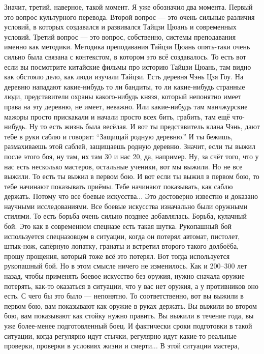 Значит, третий, наверное, 
такой момент. Я уже обозначил два момента. Первый 
это вопрос культурного перевода.
Второй вопрос --- это 
очень сильные различия условий, в которых создавался и 
развивался Тайцзи Цюань и современных условий.  Третий 
вопрос --- это вопрос, собственно, системы 
преподавания именно как методики. Методика 
преподавания Тайцзи Цюань опять-таки очень сильно была 
связана с контекстом, в котором это всё создавалось. 
То есть вот если вы посмотрите китайские фильмы про 
историю Тайцзи Цюань, там видно как обстояло 
дело, как люди изучали Тайцзи. Есть деревня Чэнь Цзя Гоу. 
На деревню нападают какие-нибудь то ли бандиты, то ли 
какие-нибудь странные люди, представители охраны
какого-нибудь князя, который непонятно имеет права на 
эту деревню, не имеет, неважно. Или какие-нибудь там 
манчжурские мажоры просто прискакали и начали просто 
всех бить, грабить, там ещё что-нибудь. Ну то есть 
жизнь была весёлая. И вот ты представитель клана Чэнь,  
дают тебе в руки саблю и говорят: ``Защищай родную деревню.''
И 
ты бежишь, размахиваешь этой саблей, защищаешь родную 
деревню.  Значит, если ты выжил после этого боя, ну 
там, их там 30 и нас 20, да, например.  Ну, за счёт того, что 
у нас есть несколько мастеров, остальные ученики, вот 
мы выжили. Но не все выжили. То есть ты выжил в первом 
бою. И вот если ты выжил в первом бою, то тебе начинают 
показывать приёмы. Тебе начинают показывать, как 
саблю держать. Потому что все боевые искусства... Это 
достоверно известно и доказано научными 
исследованиями. Все боевые искусства изначально были 
оружными стилями. То есть борьба очень сильно позднее 
добавлялась. Борьба, кулачный бой. Это как в 
современном спецназе есть такая шутка. Рукопашный бой 
используется спецназовцем в ситуации, когда он потерял 
автомат, пистолет, штык-нож, сапёрную лопатку, гранаты 
и встретил второго такого долбоёба, прошу прощения,  
который тоже всё это потерял. Вот тогда используется 
рукопашный бой. Но в этом смысле ничего не изменилось. 
Как и 200--300 лет назад, чтобы применять боевое искусство 
без оружия, нужно сначала оружие потерять, как-то 
оказаться в ситуации, что у вас нет оружия, а у 
противников оно есть. С чего бы это было --- непонятно.  
То соответственно, вот вы выжили в первом бою, вам 
показывают как оружие в руках держать. Вы выжили во 
втором бою, вам показывают как стойку нужно править.  
Вы выжили в течение года, вы уже более-менее 
подготовленный боец.  И фактически сроки подготовки в 
такой ситуации, когда регулярно идут стычки, 
регулярно идут какие-то реальные проверки, проверки в 
условиях жизни и смерти... В этой ситуации мастера, 
